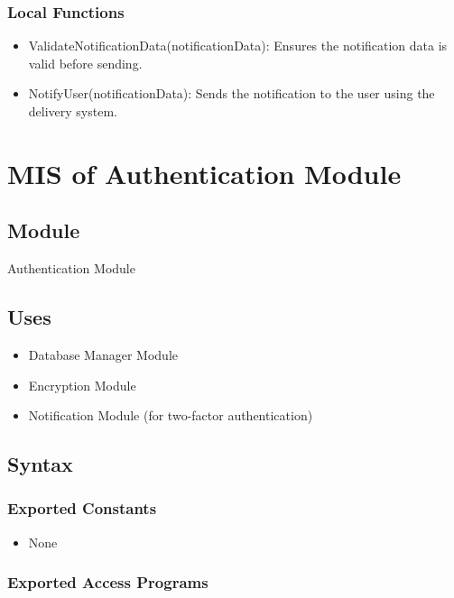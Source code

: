 \documentclass[12pt, titlepage]{article}
\begin{document}
\subsubsection{Local Functions}

\begin{itemize}
  \item ValidateNotificationData(notificationData): Ensures the notification data is valid before sending.
  \item NotifyUser(notificationData): Sends the notification to the user using the delivery system.
\end{itemize}

\newpage

\section{MIS of Authentication Module} \label{Module_Authentication}

\subsection{Module}

Authentication Module

\subsection{Uses}

\begin{itemize}
  \item Database Manager Module
  \item Encryption Module
  \item Notification Module (for two-factor authentication)
\end{itemize}

\subsection{Syntax}

\subsubsection{Exported Constants}

\begin{itemize}
  \item None
\end{itemize}

\subsubsection{Exported Access Programs}
\end{document}
